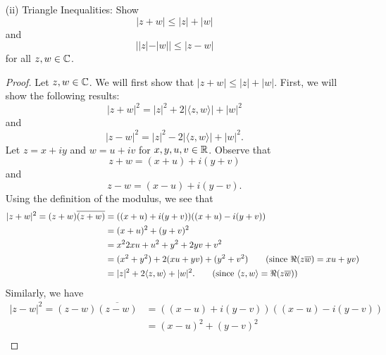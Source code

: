 \documentclass[a4paper]{article}
\begin{document}
\begin{enumerate}
\begin{enumerate}
\begin{proof}
    \begin{align*}
       | \langle z , w \rangle |^{2}   &\leq | \langle z , w \rangle |^{2} + | \langle iz , w \rangle |^{2}  
                                       = | z |^{2} | w |^{2} 
    \end{align*}
    and we are done.
                \end{proof}
            \item[(ii)] Triangle Inequalities: Show 
                \[  | z + w  | \leq | z  |  + | w  | \]
                and 
                \[  | | z  |  - | w |  | \leq | z - w  |  \]
                for all \( z,w \in \mathbb{C}  \).
                \begin{proof}
                Let \( z,w \in \mathbb{C}  \). We will first show that \(  | z + w  | \leq | z  |  + | w |  \). First, we will show the following results:
                \[  | z + w  |^{2} = | z |^{2} + 2 | \langle z , w \rangle | + | w |^{2} \tag{1} \]
                and 
                \[  | z - w  |^{2} = | z |^{2} - 2 | \langle z , w \rangle | + | w |^{2}. \tag{2}  \]
                Let \( z = x + iy \) and \( w = u + i v  \) for \( x,y,u,v \in \mathbb{R}  \). Observe that   
                \[  z + w = (x+u) + i(y +v) \]
                and 
                \[  z - w = (x-u) + i(y - v). \]
                Using the definition of the modulus, we see that
                \begin{align*}
                    | z + w  |^{2} = (z+w) \overline{(z+w)} &= ((x+u) + i(y+v)) ((x+u) - i(y+v)) \\
                                                            &= (x+u)^{2} + (y +v)^{2} \\
                                                            &= x^{2} 2xu + u^{2} + y^{2} + 2yv + v^{2} \\
                                                            &= (x^{2} + y^{2}) + 2 (xu + yv) + (y^{2} + v^{2}) \tag{since \( \Re(z \overline{w}) = xu + yv \)} \\
                                                            &= | z |^{2} + 2 \langle z , w \rangle + | w |^{2}. \tag{since \( \langle z , w \rangle = \Re(z \overline{w}) \)}
                \end{align*} 
                Similarly, we have
                \begin{align*}
                    | z - w  |^{2} = (z-w)\overline{(z-w)} &= ((x-u) + i (y - v)) ((x-u) - i (y - v)) \\
                                                           &= (x-u)^{2} + (y - v)^{2} \\

\end{align*}
\end{proof}
\end{enumerate}
\end{enumerate}
\end{document}
